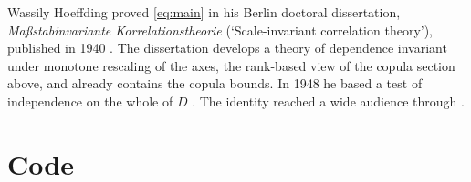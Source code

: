 \documentclass{saim-blog}
\begin{document}
Wassily Hoeffding proved \eqref{eq:main} in his Berlin doctoral dissertation, \emph{Ma{\ss}stabinvariante Korrelationstheorie} (`Scale-invariant correlation theory'), published in 1940 \citep{hoeffding1940}. The dissertation develops a theory of dependence invariant under monotone rescaling of the axes, the rank-based view of the copula section above, and already contains the copula bounds. In 1948 he based a test of independence on the whole of $D$ \citep{hoeffding1948}. The identity reached a wide audience through \citet{lehmann1966}.



{\let\SAIMplainauthors\ProjectAuthorsPlainDisplay
 \renewcommand{\ProjectAuthorsPlainDisplay}{\SAIMplainauthors\ProjectAuthorPostnominal}%
 \postauthorcard}

\clearpage
\appendix
\section{Code}

\end{document}
